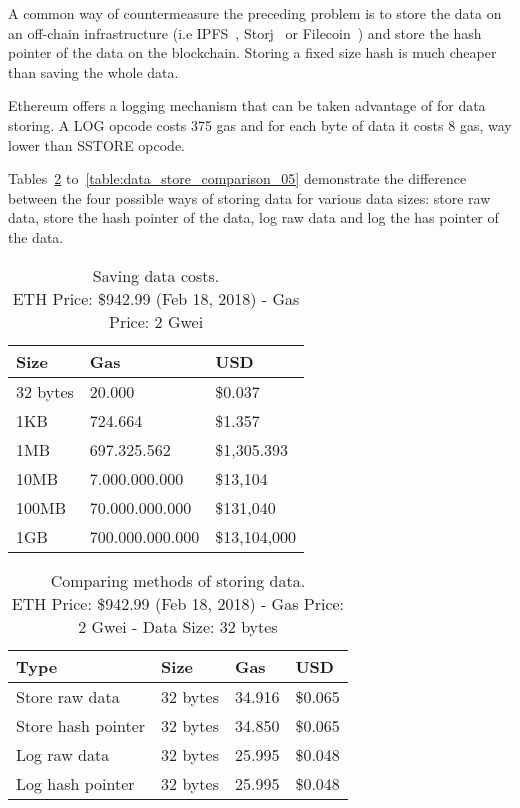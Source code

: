 A common way of countermeasure the preceding problem is to store the data on an off-chain infrastructure (i.e IPFS~\cite{ipfs}, Storj~\cite{storj} or Filecoin~\cite{filecoin}) and store the hash pointer of the data on the blockchain. Storing a fixed size hash is much cheaper than saving the whole data.

Ethereum offers a logging mechanism that can be taken advantage of for data storing. A LOG opcode costs 375 gas and for each byte of data it costs 8 gas, way lower than SSTORE opcode.

Tables~\ref{table:data_store_comparison_01} to~\ref{table:data_store_comparison_05} demonstrate the difference between the four possible ways of storing data for various data sizes: store raw data, store the hash pointer of the data, log raw data and log the has pointer of the data.

\begin{table}[!htb]
\centering
\begin{tabular}{|l|l|l|}
\hline
 Size & Gas  & USD \\ \hline
 32 bytes & 20.000  & \$0.037 \\ \hline
 1KB & 724.664  & \$1.357 \\ \hline
 1MB & 697.325.562  & \$1,305.393 \\ \hline
 10MB & 7.000.000.000  & \$13,104 \\ \hline
 100MB & 70.000.000.000  & \$131,040 \\ \hline
 1GB & 700.000.000.000  & \$13,104,000 \\ \hline
\end{tabular}
\captionsetup{format=hang, justification=centering}
\caption{Saving data costs.\\ ETH Price: \$942.99 (Feb 18, 2018) - Gas Price: 2 Gwei}
\label{table:bytes_usd_cost}
\end{table}

\begin{table}[!htb]
  \centering
  \begin{tabular}{|l|l|l|l|}
  \hline
  Type & Size & Gas  & USD \\ \hline
  Store raw data & 32 bytes & 34.916  & \$0.065 \\ \hline
  Store hash pointer & 32 bytes & 34.850  & \$0.065 \\ \hline
  Log raw data & 32 bytes & 25.995  & \$0.048 \\ \hline
  Log hash pointer & 32 bytes & 25.995  & \$0.048 \\ \hline
  \end{tabular}
  \captionsetup{format=hang, justification=centering}
  \caption{Comparing methods of storing data.\\ ETH Price: \$942.99 (Feb 18, 2018) - Gas Price: 2 Gwei - Data Size: 32 bytes}
  \label{table:data_store_comparison_01}
\end{table}

